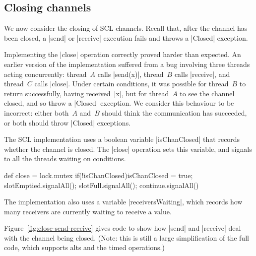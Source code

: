 \subsection{Closing channels}
\label{sec:syncchan-closing}

\inlineScala

We now consider the closing of SCL channels.  Recall that, after the channel
has been closed, a |send| or |receive| execution fails and throws a |Closed|
exception.

Implementing the |close| operation correctly proved harder than expected.  An
earlier version of the implementation suffered from a bug involving three
threads acting concurrently: thread~$A$ calls |send(x)|, thread~$B$ calls
|receive|, and thread~$C$ calls |close|.  Under certain conditions, it was
possible for thread~$B$ to return successfully, having received~|x|, but for
thread~$A$ to see the channel closed, and so throw a |Closed| exception.  We
consider this behaviour to be incorrect: either both~$A$ and~$B$ should think
the communication has succeeded, or both should throw |Closed| exceptions.


The SCL implementation uses a boolean variable |isChanClosed| that records
whether the channel is closed.  The |close| operation sets this variable, and
signals to all the threads waiting on conditions.
\begin{scala}
def close = lock.mutex{
  if(!isChanClosed){isChanClosed = true; slotEmptied.signalAll(); slotFull.signalAll(); continue.signalAll()}
}
\end{scala}

The implementation also uses a variable |receiversWaiting|, which records how
many receivers are currently waiting to receive a value. 

Figure~\ref{fig:close-send-receive} gives code to show how |send| and
|receive| deal with the channel being closed.  (Note: this is still a large
simplification of the full code, which supports alts and the timed
operations.)


